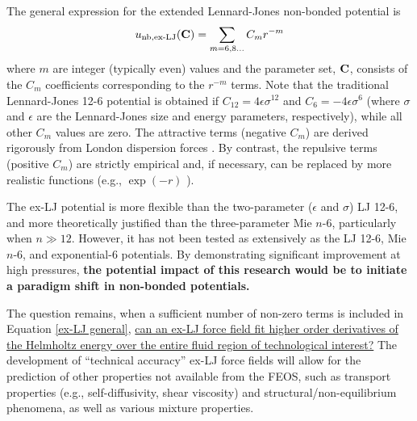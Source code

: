 \documentclass[12pt,a4paper]{article}
\newcommand{\bfm}[1]{{\bf #1}}
\newcommand{\C}{\bfm{C}}
\begin{document}
The general expression for the extended Lennard-Jones non-bonded potential is
\begin{equation} \label{ex-LJ general}
u_{\rm nb, ex\text{-}LJ}(\C) = \sum_{m = 6, 8 ...} C_m r^{-m} 
\end{equation} 
where $m$ are integer (typically even) values and the parameter set, $\C$, consists of the $C_m$ coefficients corresponding to the $r^{-m}$ terms. Note that the traditional Lennard-Jones 12-6 potential is obtained if $C_{12} = 4\epsilon\sigma^{12}$ and $C_6=-4\epsilon\sigma^{6}$ (where $\sigma$ and $\epsilon$ are the Lennard-Jones size and energy parameters, respectively), while all other $C_m$ values are zero. The attractive terms (negative $C_m$) are derived rigorously from London dispersion forces \cite{Stone2013}. By contrast, the repulsive terms (positive $C_m$) are strictly empirical and, if necessary, can be replaced by more realistic functions (e.g., $\exp(-r)$ \cite{Hellmann2017,Przybytek2017}). 



The ex-LJ potential is more flexible than the two-parameter ($\epsilon$ and $\sigma$) LJ 12-6, and more theoretically justified than the three-parameter Mie $n$-6, particularly when $n \gg 12$. However, it has not been tested as extensively as the LJ 12-6, Mie $n$-6, and exponential-6 potentials. By demonstrating significant improvement at high pressures, \textbf{the potential impact of this research would be to initiate a paradigm shift in non-bonded potentials.}

The question remains, when a sufficient number of non-zero terms is included in Equation \ref{ex-LJ general}, \ul{can an ex-LJ force field fit higher order derivatives of the Helmholtz energy over the entire fluid region of technological interest?} The development of ``technical accuracy'' ex-LJ force fields will allow for the prediction of other properties not available from the FEOS, such as transport properties (e.g., self-diffusivity, shear viscosity) and structural/non-equilibrium phenomena, as well as various mixture properties.

\end{document}
